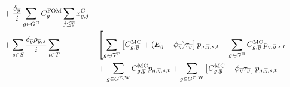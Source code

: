 \documentclass{article}
\begin{document}
\begin{alignat}{3}
	& && + \frac{\cDiscountRate[\iYearTerminal]}{\cInterestRate}\sum\limits_{\iGenerator \in \sGeneratorsCandidate} \cFixedOperationsMaintenanceCostGenerator \sum\limits_{\iYearAlias \leq \iYearTerminal} \vInstalledCapacity[\iGenerator,\iYearAlias]\\
	& && + \sum\limits_{\iScenario \in \sScenarios} \frac{\cDiscountRate[\iYearTerminal]\cScenarioDuration[\iYearTerminal,\iScenario]}{\cInterestRate} \sum\limits_{\iInterval \in \sIntervals} && \left[\sum\limits_{\iGenerator \in \sGeneratorsThermal} \left[\cMarginalCost[\iGenerator,\iYearTerminal] + (\cEmissionsIntensity - \vBaseline[\iYearTerminal])\vPermitPrice[\iYearTerminal]\right]\vPower[\iGenerator,\iYearTerminal,\iScenario,\iInterval]  + \sum\limits_{\iGenerator \in \sGeneratorsHydro}\cMarginalCost[\iGenerator,\iYearTerminal] \vPower[\iGenerator,\iYearTerminal,\iScenario,\iInterval] \right. \nonumber\\
	& && && + \sum\limits_{\iGenerator \in \sGeneratorsExistingWind} \cMarginalCost[\iGenerator,\iYearTerminal] \vPower[\iGenerator,\iYearTerminal,\iScenario,\iInterval] + \sum\limits_{\iGenerator \in \sGeneratorsCandidateWind} \left[\cMarginalCost[\iGenerator,\iYearTerminal] - \vBaseline[\iYearTerminal] \vPermitPrice[\iYearTerminal]\right] \vPower[\iGenerator,\iYearTerminal,\iScenario,\iInterval] \nonumber\\

\end{alignat}
\end{document}
